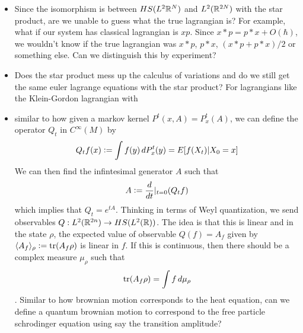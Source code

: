 \documentclass{book}
\begin{document}
\begin{itemize}
		The question is then what quantization (wigner transform) means for these stationary $\phi$ and $\pi$. We can minimize the action $S[\phi] = \int \ML(\phi, \pi)$ in $L^2(\R^{2N})$, but what does this correspond to in $HS(L^2(\R^N))$? does quantization preserve integration? i.e. $Q(\int \ML((x_j), (p_j))) = \int Q(\ML((x_j), (p_j))) = \ML((X_j), (P_j))$? 
		\item Since the isomorphism is between $HS(L^2\mathbb{R}^N)$ and $L^2(\R^{2N})$ with the star product, are we unable to guess what the true lagrangian is? For example, what if our system has classical lagrangian is $xp$. Since $x*p = p*x + O(\hbar)$, we wouldn't know if the true lagrangian was $x*p$, $p*x$, $(x*p + p*x)/2$ or something else. Can we distinguish this by experiment? 
		\item Does the star product mess up the calculus of variations and do we still get the same euler lagrange equations with the star product? For lagrangians like the Klein-Gordon lagrangian with 
		\item {} similar to how given a markov kernel $P^t(x, A) = P^t_x(A)$, we can define the operator $Q_t$ in $C^{\infty}(M)$ by 
		$$Q_t f(x) \vcentcolon= \int f(y) \, dP^t_x(y) = E[f(X_t)|X_0 = x]$$
		We can then find the infintesimal generator $A$ such that 
		$$A \vcentcolon= \frac{d}{dt}|_{t=0}(Q_tf)$$ 
		which implies that $Q_t = e^{tA}$. Thinking in terms of Weyl quantization, we send observables $Q : L^2(\mathbb{R}^{2n}) \rightarrow HS(L^2(\mathbb{R}))$. The idea is that this is linear and in the state $\rho$, the expected value of observable $Q(f) = A_f$ given by $\langle A_f \rangle_{\rho} \vcentcolon= \operatorname{\text{tr}} (A_f \rho)$ is linear in $f$. If this is continuous, then there should be a complex measure $\mu_{\rho}$ such that 
		$$\operatorname{\text{tr}}(A_f \rho) = \int f \, d \mu_{\rho}$$. Similar to how brownian motion corresponds to the heat equation, can we define a quantum brownian motion to correspond to the free particle schrodinger equation using say the transition amplitude? 

\end{itemize}
\end{document}
